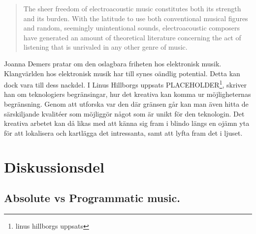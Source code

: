 \documentclass{article}
\begin{document}
\begin{quote}
The sheer freedom of electroacoustic music constitutes both its strength and its burden. With the
latitude to use both conventional musical figures and random, seemingly unintentional sounds,
electroacoustic composers have generated an amount of theoretical literature concerning the act of
listening that is unrivaled in any other genre of music.
\end{quote}


Joanna Demers pratar om den oslagbara friheten hos elektronisk musik. Klangvärlden hos elektronisk musik har
till synes oändlig potential. Detta kan dock vara till dess nackdel. I Linus Hillborgs uppsats
PLACEHOLDER\footnote{linus hillborgs uppsats}, skriver han om teknologiers begränsingar, hur det kreativa
kan komma ur möjligheternas begränsning. Genom att utforska var den där gränsen går kan man även hitta de
särskiljande kvalitéer som möjliggör något som är unikt för den teknologin. Det kreativa arbetet kan då likas
med att känna sig fram i blindo längs en ojämn yta för att lokalisera och kartlägga det intressanta, samt att
lyfta fram det i ljuset. 





\section{Diskussionsdel}
\subsection{Absolute vs Programmatic music.}

\end{document}
